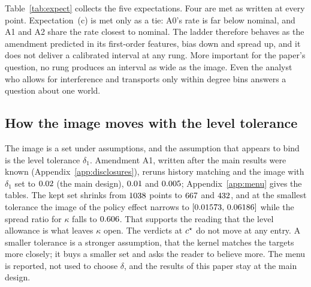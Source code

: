 Table~\ref{tab:expect} collects the five expectations. Four are met as written at
every point. Expectation~(c) is met only as a tie: A0's rate is far below nominal,
and A1 and A2 share the rate closest to nominal. The ladder therefore behaves as
the amendment predicted in its first-order features, bias down and spread up, and
it does not deliver a calibrated interval at any rung. More important for the
paper's question, no rung produces an interval as wide as the image. Even the
analyst who allows for interference and transports only within degree bins answers
a question about one world.

\subsection{How the image moves with the level tolerance}\label{sec:menu}

The image is a set under assumptions, and the assumption that appears to bind is
the level tolerance $\delta_1$. Amendment A1, written after the main results were
known (Appendix~\ref{app:disclosures}), reruns history matching and the image with
$\delta_1$ set to $0.02$ (the main design), $0.01$ and
$0.005$; Appendix~\ref{app:menu} gives the tables. The kept set
shrinks from $1038$ points to $667$ and
$432$, and at the smallest tolerance the image of the policy
effect narrows to $[0.01573,\,0.06186]$ while
the spread ratio for $\kappa$ falls to $0.606$. That
supports the reading that the level allowance is what leaves $\kappa$ open. The
verdicts at $c^\star$ do not move at any entry. A smaller tolerance is a stronger
assumption, that the kernel matches the targets more closely; it buys a smaller set
and asks the reader to believe more. The menu is reported, not used to choose
$\delta$, and the results of this paper stay at the main design.
